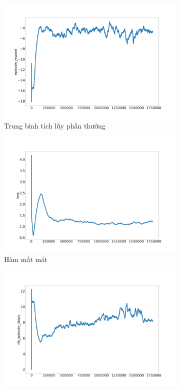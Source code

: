 \begin{figure}[hb]
    \centering
    \begin{subfigure}{.5\textwidth}
      \includegraphics[width=1.1\textwidth]{Pic/First_model/episode_reward.png}
      \caption{Trung bình tích lũy phần thưởng}
      \label{fig:first_model:try_1:avg}
    \end{subfigure}%
    \begin{subfigure}{.5\textwidth}
      \includegraphics[width=1.1\textwidth]{Pic/First_model/loss.png}
      \caption{Hàm mất mát}
      \label{fig:first_model:try_1:loss}
    \end{subfigure}
    \begin{subfigure}{.5\textwidth}
      \includegraphics[width=1.1\textwidth]{Pic/First_model/nb_episode_steps.png}

\end{subfigure}
\end{figure}
